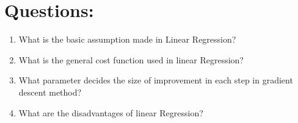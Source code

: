 \documentclass[journal,12pt,onecolumn]{IEEEtran}
\theoremstyle{remark}
\numberwithin{equation}{section}
\begin{document}
 \section{Questions:}
   \begin{enumerate}
     \item What is the basic assumption made in Linear Regression?
     \item What is the general cost function used in linear Regression?
     \item What parameter decides the size of improvement in each step in gradient descent method?
     \item What are the disadvantages of linear Regression?	
    \end{enumerate}     
\end{document}
